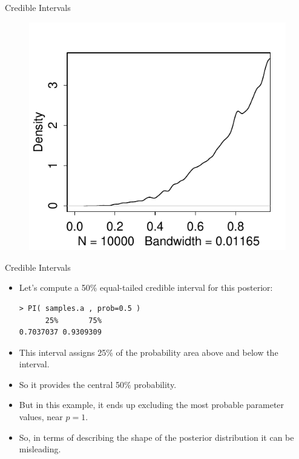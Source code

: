 \documentclass[handout]{beamer}
\begin{document}
\begin{frame}{Credible Intervals}
\scriptsize{

   \begin{figure}[h!]
	\centering
	\includegraphics[scale=0.91]{pics/post_asy.pdf}
	\end{figure} 




} 

\end{frame}

\begin{frame}[fragile]{Credible Intervals}
\scriptsize{
\begin{itemize}

\item Let's compute a 50\%  equal-tailed credible interval for this posterior:

\begin{verbatim}
> PI( samples.a , prob=0.5 )  
      25%       75% 
0.7037037 0.9309309 
\end{verbatim}

\item This interval assigns 25\% of the probability area above and below the interval. 

\item So it provides the central 50\% probability. 

\item But in this example, it ends up excluding the most probable parameter values, near $p = 1$.

\item So, in terms of describing the shape of the posterior distribution it can be misleading.


\end{itemize}



} 

\end{frame}
\end{document}
